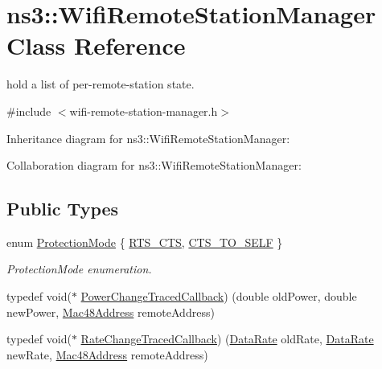 \hypertarget{classns3_1_1WifiRemoteStationManager}{}\section{ns3\+:\+:Wifi\+Remote\+Station\+Manager Class Reference}
\label{classns3_1_1WifiRemoteStationManager}


hold a list of per-\/remote-\/station state.  




{\ttfamily \#include $<$wifi-\/remote-\/station-\/manager.\+h$>$}



Inheritance diagram for ns3\+:\+:Wifi\+Remote\+Station\+Manager\+:


Collaboration diagram for ns3\+:\+:Wifi\+Remote\+Station\+Manager\+:
\subsection*{Public Types}
\begin{DoxyCompactItemize}
\item 
enum \hyperlink{classns3_1_1WifiRemoteStationManager_acd7d97851233efb176637f24b3f8abd6}{Protection\+Mode} \{ \hyperlink{classns3_1_1WifiRemoteStationManager_acd7d97851233efb176637f24b3f8abd6a9b13d2909729692abb397767e99edfd9}{R\+T\+S\+\_\+\+C\+TS}, 
\hyperlink{classns3_1_1WifiRemoteStationManager_acd7d97851233efb176637f24b3f8abd6ad0c522321faed61b29adaf6638237a13}{C\+T\+S\+\_\+\+T\+O\+\_\+\+S\+E\+LF}
 \}\begin{DoxyCompactList}\small\item\em Protection\+Mode enumeration. \end{DoxyCompactList}
\item 
typedef void($\ast$ \hyperlink{classns3_1_1WifiRemoteStationManager_a42beeaecbbf46d809418ce06e7d1e238}{Power\+Change\+Traced\+Callback}) (double old\+Power, double new\+Power, \hyperlink{classns3_1_1Mac48Address}{Mac48\+Address} remote\+Address)
\item 
typedef void($\ast$ \hyperlink{classns3_1_1WifiRemoteStationManager_a83fa46db5ba3a77b6ae62d845b5108cc}{Rate\+Change\+Traced\+Callback}) (\hyperlink{classns3_1_1DataRate}{Data\+Rate} old\+Rate, \hyperlink{classns3_1_1DataRate}{Data\+Rate} new\+Rate, \hyperlink{classns3_1_1Mac48Address}{Mac48\+Address} remote\+Address)
\end{DoxyCompactItemize}
